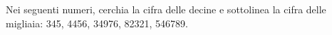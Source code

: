 \item Nei seguenti numeri, cerchia la cifra delle decine e sottolinea la cifra delle migliaia: 345, 4456, 34976, 82321, 546789.